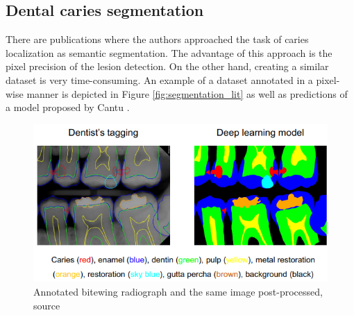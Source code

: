 \subsection{Dental caries segmentation}
There are publications where the authors approached the task of caries localization as semantic segmentation. The advantage of this approach is the pixel precision of the lesion detection. On the other hand, creating a similar dataset is very time-consuming. An example of a dataset annotated in a pixel-wise manner is depicted in Figure \ref{fig:segmentation_lit} as well as predictions of a model proposed by Cantu \cite{Cantu2020}.

\begin{figure}
    \centering
    \includegraphics[width=\linewidth]{images/segmentation_bitewing_rich.png}
    \caption{Annotated bitewing radiograph and the same image post-processed, source \cite{Lee2021}}
    \label{fig:bitewing_dense}
\end{figure}

